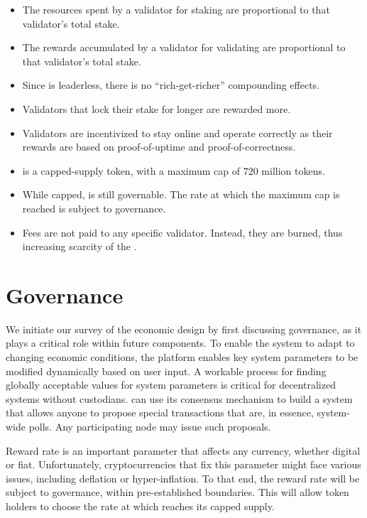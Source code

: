 \documentclass[runningheads]{llncs}
\begin{document}
\begin{itemize}
    \item The resources spent by a validator for staking are proportional to that validator's total stake. 
    \item The rewards accumulated by a validator for validating are proportional to that validator's total stake. 
    \item Since \AVAPlatformName{} is leaderless, there is no ``rich-get-richer'' compounding effects.
    \item Validators that lock their stake for longer are rewarded more.
    \item Validators are incentivized to stay online and operate correctly as their rewards are based on proof-of-uptime and proof-of-correctness.
    \item \AVATokenName{} is a capped-supply token, with a maximum cap of $720$ million tokens.
    \item While capped, \AVATokenName{} is still governable. The rate at which the maximum cap is reached is subject to governance. 
    \item Fees are not paid to any specific validator. Instead, they are burned, thus increasing scarcity of the \AVATokenName{}. 
\end{itemize}

\section{Governance}
We initiate our survey of the \AVAPlatformName{} economic design by first discussing governance, as it plays a critical role within future components. To enable the system to adapt to changing economic conditions, the \AVAPlatformName{} platform enables key system parameters to be modified dynamically based on user input. 
A workable process for finding globally acceptable values for system parameters is critical for decentralized systems without custodians. 
\AVAPlatformName{} can use its consensus mechanism to build a system that allows anyone to propose special transactions that are, in essence, system-wide polls. 
Any participating node may issue such proposals. 

Reward rate is an important parameter that affects any currency, whether digital or fiat. 
Unfortunately, cryptocurrencies that fix this parameter might face various issues, including deflation or hyper-inflation.
To that end, the reward rate will be subject to governance, within pre-established boundaries. This will allow token holders to choose the rate at which \AVATokenName{} reaches its capped supply. 
\end{document}
